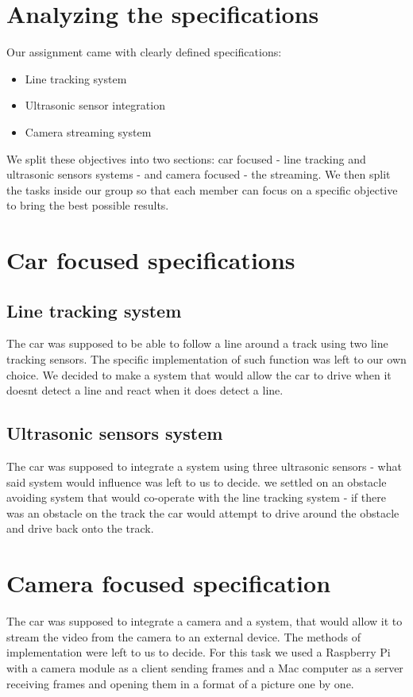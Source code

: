 \documentclass[conference]{IEEEtran}
\begin{document}
\section{Analyzing the specifications}

Our assignment came with clearly defined specifications:
\begin{itemize}
\item Line tracking system
\item Ultrasonic sensor integration
\item Camera streaming system
\end{itemize}
We split these objectives into two sections: car focused - line tracking and ultrasonic sensors systems - and camera focused - the streaming.
We then split the tasks inside our group so that each member can focus on a specific objective to bring the best possible results.


\section{Car focused specifications}
\subsection{Line tracking system}
The car was supposed to be able to follow a line around a track using two line tracking sensors. The specific implementation of such function was left to our own choice.
We decided to make a system that would allow the car to drive when it doesnt detect a line and react when it does detect a line.

\subsection{Ultrasonic sensors system}
The car was supposed to integrate a system using three ultrasonic sensors - what said system would influence was left to us to decide.
we settled on an obstacle avoiding system that would co-operate with the line tracking system - if there was an obstacle on the track the car
would attempt to drive around the obstacle and drive back onto the track.

\section{Camera focused specification}
The car was supposed to integrate a camera and a system, that would allow it to stream the video from the camera to an external device. The methods of implementation were left to us to decide.
For this task we used a Raspberry Pi with a camera module as a client sending frames and a Mac computer as a server receiving frames and opening them in a format of a picture one by one. 
\end{document}
